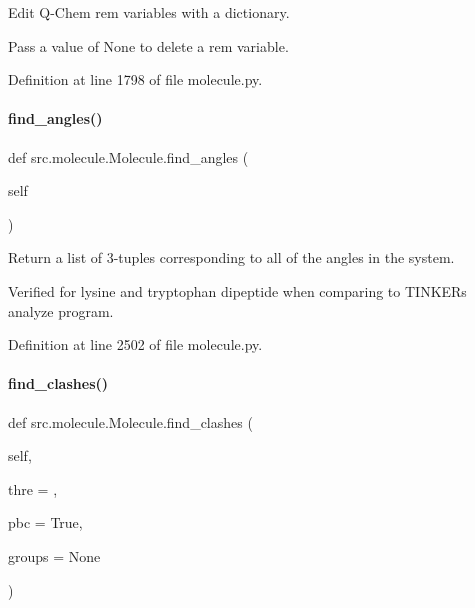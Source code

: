 Edit Q-\/\+Chem rem variables with a dictionary. 

Pass a value of None to delete a rem variable. 

Definition at line 1798 of file molecule.\+py.

\mbox{\label{classsrc_1_1molecule_1_1Molecule_ac89b40e6c15282d3c685e80672a01cbf}} 
\paragraph{\texorpdfstring{find\+\_\+angles()}{find\_angles()}}
{\footnotesize\ttfamily def src.\+molecule.\+Molecule.\+find\+\_\+angles (\begin{DoxyParamCaption}\item[{}]{self }\end{DoxyParamCaption})}



Return a list of 3-\/tuples corresponding to all of the angles in the system. 

Verified for lysine and tryptophan dipeptide when comparing to T\+I\+N\+K\+ER\textquotesingle{}s analyze program. 

Definition at line 2502 of file molecule.\+py.

\mbox{\label{classsrc_1_1molecule_1_1Molecule_a201a811c87574b4e229880540e4e6ef9}} 
\paragraph{\texorpdfstring{find\+\_\+clashes()}{find\_clashes()}}
{\footnotesize\ttfamily def src.\+molecule.\+Molecule.\+find\+\_\+clashes (\begin{DoxyParamCaption}\item[{}]{self,  }\item[{}]{thre = {},  }\item[{}]{pbc = {\ttfamily True},  }\item[{}]{groups = {\ttfamily None} }\end{DoxyParamCaption})}




